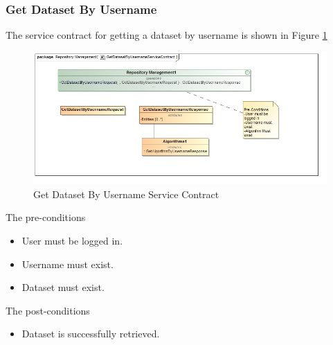 \subsubsection{Get Dataset By Username}
The service contract for getting a dataset by username is shown in Figure \ref{fig:getDatasetByUsername}
\begin{figure}[H]
	\begin{center}
		\includegraphics[scale=0.6]{../Diagrams and Charts/Test Data/GetDatasetByUsernameServiceContract.jpg}
		\caption{Get Dataset By Username Service Contract}
		\label{fig:getDatasetByUsername}
	\end{center}
	
\end{figure}  

The pre-conditions
\begin{itemize}
	\item User must be logged in.
	\item Username must exist.
	\item Dataset must exist.
\end{itemize}

The post-conditions
\begin{itemize}
	\item Dataset is successfully retrieved.
\end{itemize}
